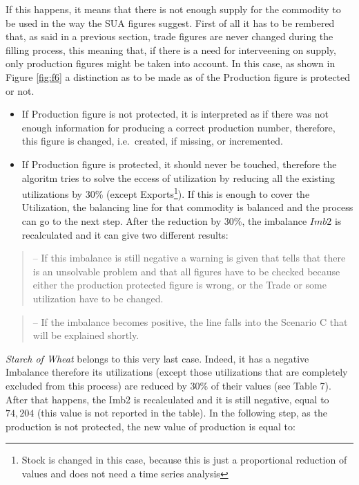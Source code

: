 \documentclass[]{article}
\providecommand{\tightlist}{%
  \setlength{\itemsep}{0pt}\setlength{\parskip}{0pt}}
\let\rmarkdownfootnote\footnote%
\def\footnote{\protect\rmarkdownfootnote}
\begin{document}
If this happens, it means that there is not enough supply for the
commodity to be used in the way the SUA figures suggest. First of all it
has to be rembered that, as said in a previous section, trade figures
are never changed during the filling process, this meaning that, if
there is a need for interveening on supply, only production figures
might be taken into account. In this case, as shown in Figure
\ref{fig:f6} a distinction as to be made as of the Production figure is
protected or not.

\begin{itemize}
\tightlist
\item
  If Production figure is not protected, it is interpreted as if there
  was not enough information for producing a correct production number,
  therefore, this figure is changed, i.e.~created, if missing, or
  incremented.
\item
  If Production figure is protected, it should never be touched,
  therefore the algoritm tries to solve the eccess of utilization by
  reducing all the existing utilizations by 30\% (except
  Exports\footnote{Stock is changed in this case, because this is just a
    proportional reduction of values and does not need a time series
    analysis}). If this is enough to cover the Utilization, the
  balancing line for that commodity is balanced and the process can go
  to the next step. After the reduction by 30\%, the imbalance \(Imb2\)
  is recalculated and it can give two different results:
\end{itemize}

\begin{quote}
-- If this imbalance is still negative a warning is given that tells
that there is an unsolvable problem and that all figures have to be
checked because either the production protected figure is wrong, or the
Trade or some utilization have to be changed.
\end{quote}

\begin{quote}
-- If the imbalance becomes positive, the line falls into the Scenario C
that will be explained shortly.
\end{quote}

\emph{Starch of Wheat} belongs to this very last case. Indeed, it has a
negative Imbalance therefore its utilizations (except those utilizations
that are completely excluded from this process) are reduced by 30\% of
their values (see Table 7). After that happens, the Imb2 is recalculated
and it is still negative, equal to \(74,204\) (this value is not
reported in the table). In the following step, as the production is not
protected, the new value of production is equal to:
\end{document}
